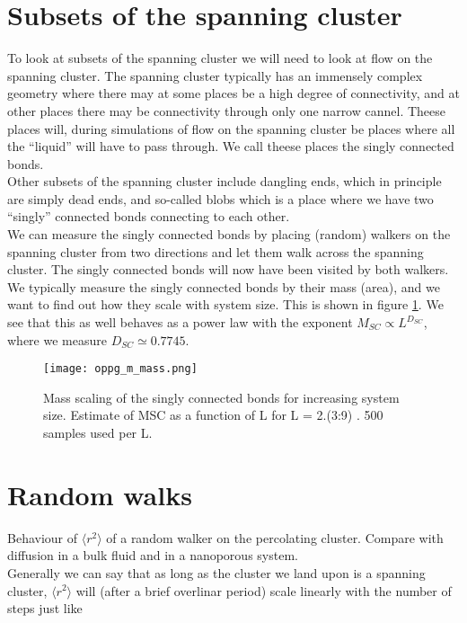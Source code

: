 \documentclass[a4paper,english, 10pt, twoside]{article}
\begin{document}
\section{Subsets of the spanning cluster}
To look at subsets of the spanning cluster we will need to look at flow on the spanning cluster. The spanning cluster typically has 
an immensely complex geometry where there may at some places be a high degree of connectivity, and at other places there may be 
connectivity through only one narrow cannel. Theese places will, during simulations of flow on the spanning cluster be places where 
all the ``liquid'' will have to pass through. We call theese places the singly connected bonds.\\
Other subsets of the spanning cluster include dangling ends, which in principle are simply dead ends, and so-called blobs which is a 
place where we have two ``singly'' connected bonds connecting to each other.\\
We can measure the singly connected bonds by placing (random) walkers on the spanning cluster from two directions and let them walk 
across the spanning cluster. The singly connected bonds will now have been visited by both walkers. We typically measure the 
singly connected bonds by their mass (area), and we want to find out how they scale with system size. This is shown in figure 
\ref{singly_connected}. We see that this as well behaves as a power law with the exponent $M_{SC} \propto L^{D_{SC}}$, where we measure 
$D_{SC} \simeq 0.7745$.

\begin{figure}[H]
\centering
\texttt{[image: oppg\_m\_mass.png]}
\caption{Mass scaling of the singly connected bonds for increasing system size. Estimate of MSC as a function of L for L = 2.(3:9) . 500 samples used per L.
}
\label{singly_connected}
\end{figure}



\section{Random walks}
Behaviour of $\langle r^2\rangle$ of a random walker on the percolating cluster. Compare with diffusion in a bulk fluid and in 
a nanoporous system.\\

Generally we can say that as long as the cluster we land upon is a spanning cluster, $\langle r^2\rangle$ will (after a brief 
overlinar period) scale linearly with the number of steps just like 
\end{document}
